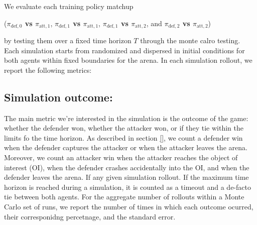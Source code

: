 We evaluate each training policy matchup 

({\boldmath\textbf{$\pi_{\mathrm{def},0}$ vs $\pi_{\mathrm{att},1}$}}, {\boldmath\textbf{$\pi_{\mathrm{def},1}$ vs $\pi_{\mathrm{att},1}$}}, {\boldmath\textbf{$\pi_{\mathrm{def},1}$ vs $\pi_{\mathrm{att},2}$}}, and {\boldmath\textbf{$\pi_{\mathrm{def},2}$ vs $\pi_{\mathrm{att},2}$}})


by testing them over a fixed time horizon \(T\) through the monte calro testing. Each simulation starts from randomized and dispersed in initial conditions for both agents within fixed boundaries for the arena. In each simulation rollout, we report the following metrics:


\subsection*{Simulation outcome:}

The main metric we're interested in the simulation is the outcome of the game: whether the defender won, whether the attacker won, or if they tie within the limits fo the time horizon. As described in section \ref{}, we count a defender win when the defender captures the attacker or when the attacker leaves the arena. Moreover, we count an attacker win when the attacker reaches the object of interest (OI), when the defender crashes accidentally into the OI, and when the defender leaves the arena. If any given simulation rollout. If the maximum time horizon is reached during a simulation, it is counted as a timeout and a de-facto tie between both agents. For the aggregate number of rollouts within a Monte Carlo set of runs, we report the number of times in which each outcome ocurred, their corresponidng percetnage, and the standard error. 






